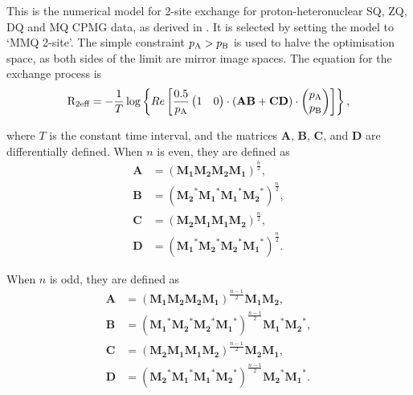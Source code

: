 This is the numerical model for 2-site exchange for proton-heteronuclear SQ, ZQ, DQ and MQ CPMG data, as derived in \citep{Korzhnev04a,Korzhnev04b,Korzhnev05}.
It is selected by setting the model to `MMQ 2-site'.
The simple constraint $p_\textrm{A} > p_\textrm{B}$ is used to halve the optimisation space, as both sides of the limit are mirror image spaces.
The equation for the exchange process is 
\begin{equation}
    \mathrm{R}_\textrm{2eff} = - \frac{1}{T}
                 \log \left\{ Re \left[ \frac{0.5}{p_\textrm{A}}
                     \begin{pmatrix}1&0\end{pmatrix} \cdot \left( \mathbf{AB} + \mathbf{CD} \right) \cdot \begin{pmatrix}p_\textrm{A}\\p_\textrm{B}\end{pmatrix}
                 \right] \right\},
\end{equation}

where $T$ is the constant time interval, and the matrices $\mathbf{A}$, $\mathbf{B}$, $\mathbf{C}$, and $\mathbf{D}$ are differentially defined.
When $n$ is even, they are defined as 
\begin{subequations}
\begin{align}
    \mathbf{A} &= \left( \mathbf{M_1} \mathbf{M_2} \mathbf{M_2} \mathbf{M_1} \right)^{\frac{n}{2}}, \\
    \mathbf{B} &= \left( \mathbf{M_2}^* \mathbf{M_1}^* \mathbf{M_1}^* \mathbf{M_2}^* \right)^{\frac{n}{2}}, \\
    \mathbf{C} &= \left( \mathbf{M_2} \mathbf{M_1} \mathbf{M_1} \mathbf{M_2} \right)^{\frac{n}{2}}, \\
    \mathbf{D} &= \left( \mathbf{M_1}^* \mathbf{M_2}^* \mathbf{M_2}^* \mathbf{M_1}^* \right)^{\frac{n}{2}}.
\end{align}
\end{subequations}

When $n$ is odd, they are defined as
\begin{subequations}
\begin{align}
    \mathbf{A} &= \left( \mathbf{M_1} \mathbf{M_2} \mathbf{M_2} \mathbf{M_1} \right)^{\frac{n-1}{2}} \mathbf{M_1} \mathbf{M_2}, \\
    \mathbf{B} &= \left( \mathbf{M_1}^* \mathbf{M_2}^* \mathbf{M_2}^* \mathbf{M_1}^* \right)^{\frac{n-1}{2}} \mathbf{M_1}^* \mathbf{M_2}^*, \\
    \mathbf{C} &= \left( \mathbf{M_2} \mathbf{M_1} \mathbf{M_1} \mathbf{M_2} \right)^{\frac{n-1}{2}} \mathbf{M_2} \mathbf{M_1}, \\
    \mathbf{D} &= \left( \mathbf{M_2}^* \mathbf{M_1}^* \mathbf{M_1}^* \mathbf{M_2}^* \right)^{\frac{n-1}{2}} \mathbf{M_2}^* \mathbf{M_1}^*.
\end{align}
\end{subequations}

